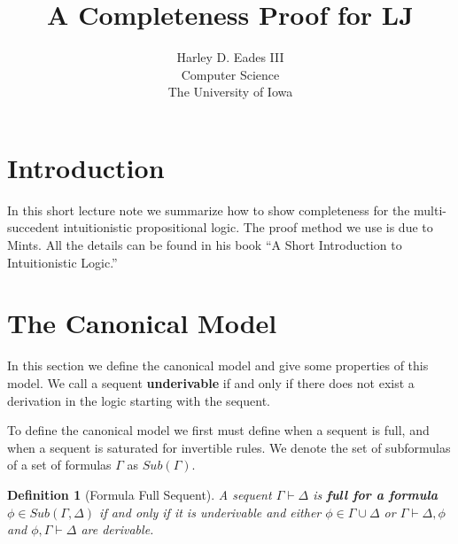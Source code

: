 \documentclass{article}
\begin{document}

\newtheorem{thm}{Theorem}
\newtheorem{lemma}[thm]{Lemma}

\newtheorem{corollary}[thm]{Corollary}
\newtheorem{definition}[thm]{Definition}
\newtheorem{remark}[thm]{Remark}
\newtheorem{proposition}[thm]{Proposition}
\newtheorem{notn}[thm]{Notation}
\newtheorem{observation}[thm]{Observation}

\newcommand{\interp}[1]{[\negthinspace[#1]\negthinspace]}
\newcommand{\normto}[0]{\rightsquigarrow^{!}}
\newcommand{\case}[4]{\text{case}\ #1\ \text{of}\ #2\text{.}#3\text{,}#2\text{.}#4}
\newcommand{\join}[0]{\downarrow}

\title{A Completeness Proof for LJ}
\author{Harley D. Eades III \\
Computer Science\\
The University of Iowa}

\maketitle

\section{Introduction}
\label{sec:introduction}
In this short lecture note we summarize how to show completeness for
the multi-succedent intuitionistic propositional logic.  The proof
method we use is due to Mints.  All the details can be found in his
book ``A Short Introduction to Intuitionistic Logic.'' 

\section{The Canonical Model}
\label{sec:the_canonical_model}
In this section we define the canonical model and give some properties
of this model.  We call a sequent \textbf{underivable} if and only if
there does not exist a derivation in the logic starting with the
sequent.  

To define the canonical model we first must define when a sequent is
full, and when a sequent is saturated for invertible rules.  We
denote the set of subformulas of a set of formulas $\Gamma$ as
$Sub(\Gamma)$.

\begin{definition}[Formula Full Sequent]
  \label{def:full_sequent_formula}  
  A sequent $\Gamma \vdash \Delta$ is \textbf{full for a formula} $\phi \in Sub(\Gamma,\Delta)$ if and only if 
  it is underivable and either $\phi \in \Gamma \cup \Delta$ or $\Gamma \vdash \Delta,\phi$ and $\phi,\Gamma \vdash \Delta$
  are derivable.
\end{definition}
\end{document}
